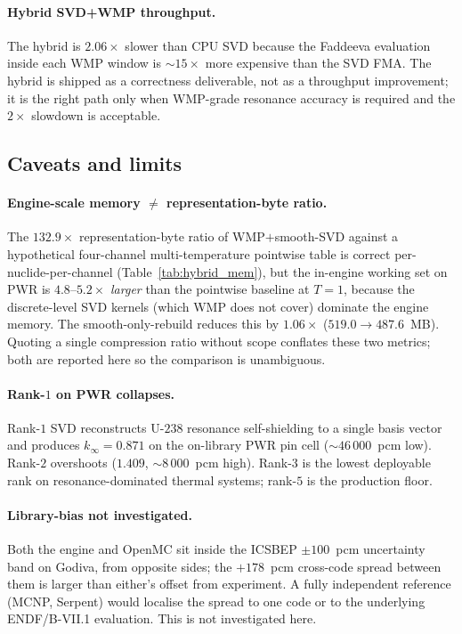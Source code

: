 \paragraph{Hybrid SVD+WMP throughput.}
The hybrid is $2.06\times$ slower than CPU SVD because
the Faddeeva evaluation inside each WMP window is
$\sim\!15\times$ more expensive than the SVD FMA. The
hybrid is shipped as a correctness deliverable, not as
a throughput improvement; it is the right path only when
WMP-grade resonance accuracy is required and the
$2\times$ slowdown is acceptable.

\subsection{Caveats and limits}
\label{sec:caveats}

\paragraph{Engine-scale memory $\neq$ representation-byte
ratio.}
The $132.9\times$ representation-byte ratio of
WMP$+$smooth-SVD against a hypothetical four-channel
multi-temperature pointwise table is correct
per-nuclide-per-channel
(Table~\ref{tab:hybrid_mem}), but the in-engine working
set on PWR is $4.8$--$5.2\times$ \emph{larger} than the
pointwise baseline at $T = 1$, because the discrete-level
SVD kernels (which WMP does not cover) dominate the
engine memory. The smooth-only-rebuild reduces this by
$1.06\times$ ($519.0 \to 487.6$~MB). Quoting a single
compression ratio without scope conflates these two
metrics; both are reported here so the comparison is
unambiguous.

\paragraph{Rank-$1$ on PWR collapses.}
Rank-$1$ SVD reconstructs U-$238$ resonance self-shielding
to a single basis vector and produces $k_\infty = 0.871$
on the on-library PWR pin cell ($\sim\!46\,000$~pcm
low). Rank-$2$ overshoots ($1.409$, $\sim\!8\,000$~pcm
high). Rank-$3$ is the lowest deployable rank
on resonance-dominated thermal systems; rank-$5$ is the
production floor.

\paragraph{Library-bias not investigated.}
Both the engine and OpenMC sit inside the ICSBEP
$\pm 100$~pcm uncertainty band on Godiva, from opposite
sides; the $+178$~pcm cross-code spread between them is
larger than either's offset from experiment. A fully
independent reference (MCNP, Serpent) would localise the
spread to one code or to the underlying ENDF/B-VII.1
evaluation. This is not investigated here.

